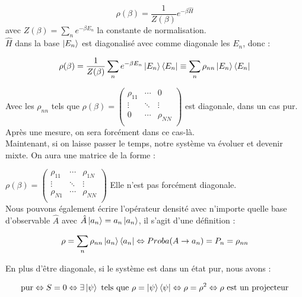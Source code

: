 \documentclass[11pt]{article}
\begin{document}
\[
\rho(\beta) = \frac{1}{Z(\beta)} e^{-\beta \hat H}
\]
avec $Z(\beta) = \sum_n e^{-\beta E_n}$ la constante de normalisation.\\
\vspace{0.2cm}
$\hat H$ dans la base $\ket{E_n}$ est diagonalisé avec comme diagonale les $E_n$, donc :

\[
\rho(\beta) = \frac{1}{Z(\beta)} \sum_n  e^{-\beta E_n}\ket{E_n}\bra{E_n} \equiv  \sum_n \rho_{nn}\ket{E_n}\bra{E_n}
\]

Avec les $\rho_{nn}$ tels que $\rho(\beta) = \begin{pmatrix}
    \rho_{11} & \cdots & 0\\
    \vdots & \ddots & \vdots\\
    0  & \cdots & \rho_{NN}\\
\end{pmatrix}$ est diagonale, dans un cas pur. 
\vspace{0.2cm}
Après une mesure, on sera forcément dans ce cas-là.\\
\vspace{0.5cm}
\qquad Maintenant, si on laisse passer le temps, notre système va évoluer et devenir mixte. On aura une matrice de la forme :
\vspace{0.2cm}

\qquad $\rho(\beta) = \begin{pmatrix}
    \rho_{11} & \cdots & \rho_{1N}\\
    \vdots & \ddots & \vdots\\
    \rho_{N1}  & \cdots & \rho_{NN}\\
\end{pmatrix}$ Elle n'est pas forcément diagonale.\\
\vspace{0.2cm}
Nous pouvons également écrire l'opérateur densité avec n'importe quelle base d'observable $\hat A$ avec $\hat A \ket{a_n} = a_n \ket{a_n}$, il s'agit d'une définition :

\[
\rho = \sum_n \rho_{nn}\ket{a_n}\bra{a_n} \Leftrightarrow Proba(A \rightarrow a_n) = P_n = \rho_{nn}
\]

En plus d'être diagonale, si le système est dans un état pur, nous avons :

\[
\text{pur} \Leftrightarrow S = 0 \Leftrightarrow \exists \ket{\psi} \text{ tels que } \rho = \ket{\psi}\bra{\psi} \Leftrightarrow \rho = \rho^2 \Leftrightarrow \rho \text{ est un projecteur}
\]
\end{document}
